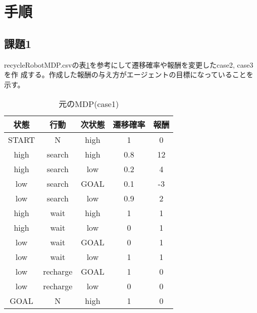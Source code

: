 \section{手順}
\subsection{課題1}
recycleRobotMDP.csvの表\ref{table:1}を参考にして遷移確率や報酬を変更したcase2, case3を作
成する。作成した報酬の与え方がエージェントの目標になっていることを示す。
\begin{table}[hbtp]
  \begin{minipage}[t]{\hsize}
  \centering
  \caption{元のMDP(case1)}
  \label{table:1}
    \begin{tabular}{|c|c|c|c|c|}
      \hline
      状態 & 行動 & 次状態 & 遷移確率 & 報酬\\
      \hline
      \hline
      START & N & high & 1 & 0 \\
      \hline
      high & search & high & 0.8 & 12 \\
      high & search & low & 0.2 & 4 \\
      \hline
      low & search & GOAL & 0.1 & -3 \\
      low & search & low & 0.9 & 2 \\
      \hline
      high & wait & high & 1 & 1 \\
      high & wait & low & 0 & 1 \\
      \hline
      low & wait & GOAL & 0 & 1 \\
      low & wait & low & 1 & 1 \\
      \hline
      low & recharge & GOAL & 1 & 0 \\
      low & recharge & low & 0 & 0 \\
      \hline
      GOAL & N & high & 1 & 0 \\
      \hline
    \end{tabular}
  \end{minipage}
\end{table}

